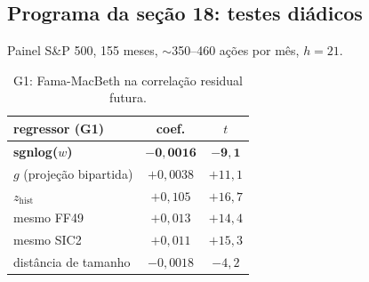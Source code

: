 \documentclass[11pt,a4paper]{article}
\begin{document}
\subsection{Programa da seção 18: testes diádicos}

Painel S\&P 500, 155 meses, $\sim$350--460 ações por mês, $h=21$.

\begin{table}[h]
\centering\small
\begin{tabular}{lcc}
\toprule
regressor (G1) & coef. & $t$ \\
\midrule
\textbf{sgnlog($w$)} & $\mathbf{-0{,}0016}$ & $\mathbf{-9{,}1}$ \\
$g$ (projeção bipartida) & $+0{,}0038$ & $+11{,}1$ \\
$z_{\text{hist}}$ & $+0{,}105$ & $+16{,}7$ \\
mesmo FF49 & $+0{,}013$ & $+14{,}4$ \\
mesmo SIC2 & $+0{,}011$ & $+15{,}3$ \\
distância de tamanho & $-0{,}0018$ & $-4{,}2$ \\
\bottomrule
\end{tabular}
\caption{G1: Fama-MacBeth na correlação residual futura.}
\end{table}
\end{document}
